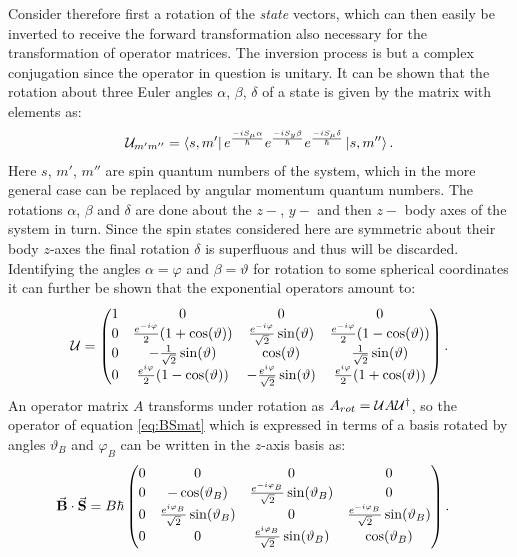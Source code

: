 \documentclass[a4paper]{article}
\begin{document}
Consider therefore first a rotation of the \textit{state} vectors, which can then easily
be inverted to receive the forward transformation also necessary for the transformation
of operator matrices. The inversion process is but a complex
conjugation since the operator in question is unitary. It can be shown 
that the rotation about three Euler angles \(\alpha\), \(\beta\), \(\delta\) of a state is
given  by the matrix with elements as\cite{sakurai}:
\begin{align*}
        \mathbb{\cal U}_{m'm''} = \bra{s,
        m'}e^{\frac{-iS_\mu\alpha}{\hbar}}e^{\frac{-iS_y\beta}{\hbar}}e^{\frac{-iS_\mu\delta}{\hbar{}}}\ket{s,
m''}
.\end{align*}
Here \(s\), \(m'\), \(m''\) are spin quantum numbers of the system, which in the more general
case can be replaced by angular momentum quantum numbers. The rotations \(\alpha\),
\(\beta\) and \(\delta\) are done about the \(z-\), \(y-\) and then \(z-\) body axes of
the system in turn. Since the spin states considered here are symmetric about their
body \(z\)-axes the final rotation \(\delta\) is superfluous and thus will be discarded.
Identifying the angles \(\alpha = \varphi\) and \(\beta = \vartheta\) for rotation to some
spherical coordinates it can further be
shown that the exponential operators amount to:
\begin{align*}
        \U = \pmqty{
        1 & 0 & 0 & 0\\
        0 & \frac{e^{-i\varphi}}{2}(1+\cos(\vartheta)) &
        \frac{e^{-i\varphi}}{\sqrt{2}}\sin(\vartheta) &
        \frac{e^{-i\varphi}}{2}(1-\cos(\vartheta))\\
        0 & -\frac{1}{\sqrt{2}}\sin(\vartheta) & \cos(\vartheta) & \frac{1}{\sqrt{2} }
        \sin(\vartheta)\\
        0 & \frac{e^{i\varphi}}{2}(1-\cos(\vartheta)) &
        -\frac{e^{i\varphi}}{\sqrt{2}}\sin(\vartheta) & \frac{e^{i\varphi}}{2}(1 +
        \cos(\vartheta))
}
.\end{align*}
An operator matrix \(A\) transforms under rotation as \(A_{rot} = \mathbb{\cal U} A\mathbb{\cal U}^{\dagger}\), so
the operator of equation \ref{eq:BSmat} which is expressed in terms of a basis rotated by
angles \(\vartheta_B\) and \(\varphi_B\) can be written in the \(z\)-axis basis as:
\begin{align}\label{eq:BSrot}
    \va{B}\cdot \va{S} &= B\hbar{}\pmqty{
            0 & 0 & 0 & 0\\
            0 & -\cos(\vartheta_B) & \frac{e^{-i\varphi_B}}{\sqrt{2} }\sin(\vartheta_B) & 0\\
                    0 & \frac{e^{i\varphi_B}}{\sqrt{2} }\sin(\vartheta_B) & 0 &
                    \frac{e^{-i\varphi_B}}{\sqrt{2} }\sin(\vartheta_B)\\
                    0 & 0 & \frac{e^{i\varphi_B}}{\sqrt{2} }\sin(\vartheta_B) & \cos(\vartheta_B)
            }
.\end{align}
\end{document}
